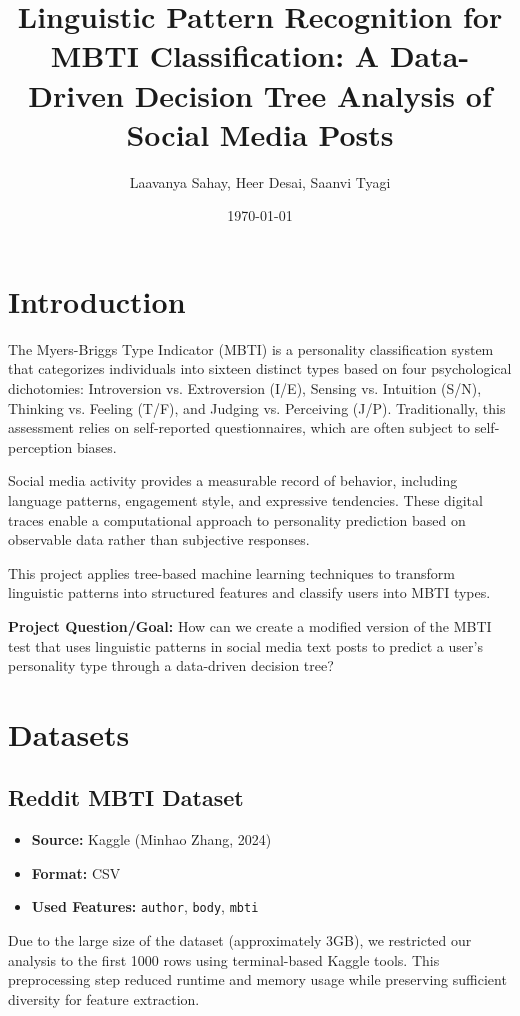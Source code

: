 \documentclass[11pt]{article}
\title{Linguistic Pattern Recognition for MBTI Classification: A Data-Driven Decision Tree Analysis of Social Media Posts}
\author{Laavanya Sahay, Heer Desai, Saanvi Tyagi}
\date{\today}
\begin{document}
\maketitle

\section{Introduction}

The Myers-Briggs Type Indicator (MBTI) is a personality classification system that categorizes individuals into sixteen distinct types based on four psychological dichotomies: Introversion vs. Extroversion (I/E), Sensing vs. Intuition (S/N), Thinking vs. Feeling (T/F), and Judging vs. Perceiving (J/P). Traditionally, this assessment relies on self-reported questionnaires, which are often subject to self-perception biases. 

Social media activity provides a measurable record of behavior, including language patterns, engagement style, and expressive tendencies. These digital traces enable a computational approach to personality prediction based on observable data rather than subjective responses.

This project applies tree-based machine learning techniques to transform linguistic patterns into structured features and classify users into MBTI types.

\medskip

\textbf{Project Question/Goal:} How can we create a modified version of the MBTI test that uses linguistic patterns in social media text posts to predict a user's personality type through a data-driven decision tree? 

\section{Datasets}

\subsection{Reddit MBTI Dataset}
\begin{itemize}
    \item \textbf{Source:} Kaggle (Minhao Zhang, 2024)
    \item \textbf{Format:} CSV
    \item \textbf{Used Features:} \texttt{author}, \texttt{body}, \texttt{mbti}
\end{itemize}

Due to the large size of the dataset (approximately 3GB), we restricted our analysis to the first 1000 rows using terminal-based Kaggle tools. This preprocessing step reduced runtime and memory usage while preserving sufficient diversity for feature extraction.
\end{document}

